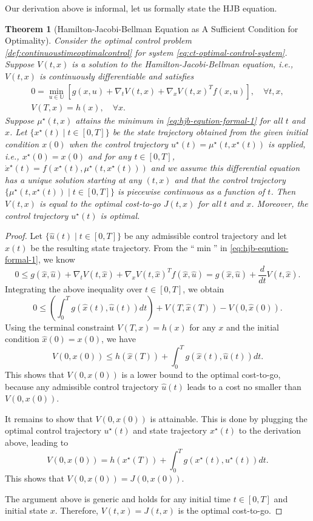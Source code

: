 \documentclass[
]{book}
\newtheorem{theorem}{Theorem}[chapter]
\theoremstyle{definition}
\theoremstyle{definition}
\theoremstyle{definition}
\theoremstyle{definition}
\theoremstyle{remark}
\begin{document}
Our derivation above is informal, let us formally state the HJB equation.

\begin{theorem}[Hamilton-Jacobi-Bellman Equation as A Sufficient Condition for Optimality]
\protect\hypertarget{thm:hjbsufficient}{}\label{thm:hjbsufficient}Consider the optimal control problem \ref{def:continuoustimeoptimalcontrol} for system \eqref{eq:ct-optimal-control-system}. Suppose \(V(t,x)\) is a solution to the Hamilton-Jacobi-Bellman equation, i.e., \(V(t,x)\) is continuously differentiable and satisfies
\begin{align}
\label{eq:hjb-eqution-formal-1}
0 = \min_{u \in \mathbb{U}} \left[ g(x,u) + \nabla_t V(t,x) + \nabla_x V(t,x)^T f(x,u)\right], \quad \forall t,x, \\
V(T,x) = h(x), \quad \forall x.
\end{align}
Suppose \(\mu^\star(t,x)\) attains the minimum in \eqref{eq:hjb-eqution-formal-1} for all \(t\) and \(x\). Let \(\{x^\star(t) \mid t \in [0,T] \}\) be the state trajectory obtained from the given initial condition \(x(0)\) when the control trajectory \(u^\star(t) = \mu^\star(t,x^\star(t))\) is applied, i.e., \(x^\star(0) = x(0)\) and for any \(t \in [0,T]\), \(\dot{x}^\star(t) = f(x^\star(t), \mu^\star(t,x^\star(t)))\) and we assume this differential equation has a unique solution starting at any \((t,x)\) and that the control trajectory \(\{ \mu^\star(t,x^\star(t)) \mid t \in [0,T] \}\) is piecewise continuous as a function of \(t\).
Then \(V(t,x)\) is equal to the optimal cost-to-go \(J(t,x)\) for all \(t\) and \(x\). Moreover, the control trajectory \(u^\star(t)\) is optimal.
\end{theorem}

\begin{proof}
Let \(\{\hat{u}(t) \mid t \in [0,T] \}\) be any admissible control trajectory and let \(\hat{x}(t)\) be the resulting state trajectory. From the ``\(\min\)'' in \eqref{eq:hjb-eqution-formal-1}, we know
\[
0 \leq g(\hat{x},\hat{u}) + \nabla_t V(t,\hat{x}) + \nabla_x V(t,\hat{x})^T f(\hat{x},\hat{u}) = g(\hat{x},\hat{u}) + \frac{d}{dt} V(t,\hat{x}).
\]
Integrating the above inequality over \(t \in [0,T]\), we obtain
\[
0 \leq \left( \int_{0}^T g(\hat{x}(t),\hat{u}(t))dt \right) + V(T,\hat{x}(T)) - V(0,\hat{x}(0)).
\]
Using the terminal constraint \(V(T,x) = h(x)\) for any \(x\) and the initial condition \(\hat{x}(0) = x(0)\), we have
\[
V(0,x(0)) \leq h(\hat{x}(T)) + \int_{0}^T g(\hat{x}(t),\hat{u}(t)) dt.
\]
This shows that \(V(0,x(0))\) is a lower bound to the optimal cost-to-go, because any admissible control trajectory \(\hat{u}(t)\) leads to a cost no smaller than \(V(0,x(0))\).

It remains to show that \(V(0,x(0))\) is attainable. This is done by plugging the optimal control trajectory \(u^\star(t)\) and state trajectory \(x^\star(t)\) to the derivation above, leading to
\[
V(0,x(0)) = h(x^\star(T)) + \int_0^T g(x^\star(t),u^\star(t)) dt.
\]
This shows that \(V(0,x(0)) = J(0,x(0))\).

The argument above is generic and holds for any initial time \(t \in [0,T]\) and initial state \(x\). Therefore, \(V(t,x) = J(t,x)\) is the optimal cost-to-go.
\end{proof}
\end{document}
